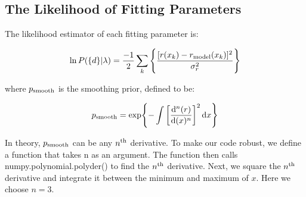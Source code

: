 \subsection{The Likelihood of Fitting Parameters}
\label{subsec:likelihood}

The likelihood estimator of each fitting parameter is:

\begin{equation}
\label{likelihood}
\ln{P(\{d\}|\lambda)} = \frac{-1}{2}\sum_{k} \qty{\frac{[r(x_k) -r_{\rm model}(x_k)]^2}{\sigma_r^2}}
\end{equation}

where $p_{\rm smooth}$ is the smoothing prior, defined to be:

\begin{equation}
\label{smoothing_prior}
p_{\rm smooth} = \exp{-\int \qty[\dv[n]{(r)}{(x)}]^2 \dd{x}}
\end{equation}

In theory, $p_{\rm smooth}$ can be any $n^{\rm th}$ derivative. To make our code robust, we define a function that takes n as an argument. The function then calls numpy.polynomial.polyder() to find the $n^{\rm th}$ derivative. Next, we square the $n^{\rm th}$ derivative and integrate it between the minimum and maximum of $x$. Here we choose $n = 3$.